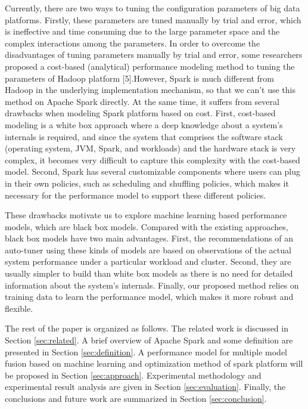 \par Currently, there are two ways to tuning the configuration parameters of big data platforms. Firstly, these parameters are tuned manually by trial and error, which is ineffective and time consuming due to the large parameter space and the complex interactions among the parameters. In order to overcome the disadvantages of tuning parameters manually by trial and error, some researchers proposed a cost-based
(analytical) performance modeling method to tuning the parameters of Hadoop platform [5].However, Spark is much different from Hadoop in the underlying implementation mechanism, so that we can’t use this method on Apache Spark directly. At the same time, it suffers from several drawbacks when modeling Spark platform based on cost. First, cost-based modeling is a white box approach where a deep knowledge
about a system’s internals is required, and since the system that comprises the software stack (operating system, JVM, Spark, and workloads) and the hardware stack is very complex, it becomes very difficult to capture this complexity with the cost-based model. Second, Spark has several customizable components where users can plug in their own policies, such as scheduling and shuffling policies, which makes it necessary for the performance model to support these different policies.

\par These drawbacks motivate us to explore machine learning based performance models, which are black box models. Compared with the existing approaches, black box models have two main advantages. First, the recommendations of an auto-tuner using these kinds of models are based on observations of the actual system performance under a particular workload and cluster. Second, they are usually simpler to build than white box models as there is no need for detailed information about the system’s internals. Finally, our
proposed method relies on training data to learn the performance model, which makes it more robust and flexible.

\par The rest of the paper is organized as follows. The related work is discussed in Section \ref{sec:related}. A brief overview of Apache Spark and some definition are presented in Section \ref{sec:definition}. A performance model for multiple model fusion based on machine learning and optimization method of spark platform will be proposed in Section \ref{sec:approach}. Experimental methodology and experimental result analysis are given in Section \ref{sec:evaluation}. Finally, the conclusions and future work are summarized in Section \ref{sec:conclusion}. 

